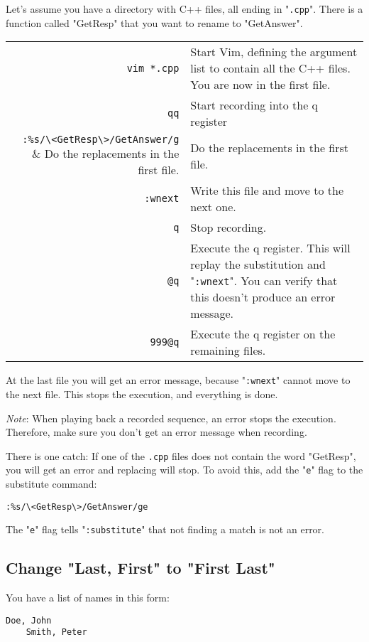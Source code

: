 Let's assume you have a directory with C++ files, all ending in "\verb!.cpp!".
There is a function called "GetResp" that you want to rename to "GetAnswer".

\begin{center} \begin{longtable}{r l}
				\verb!vim *.cpp! & Start Vim, defining the argument list to contain all the C++ files.
				You are now in the first file. \\
				\verb!qq! & Start recording into the q register \\
				\verb!:%s/\<GetResp\>/GetAnswer/g! & Do the replacements in the first file. \\
				\verb!:wnext! & Write this file and move to the next one. \\
				\verb!q! & Stop recording. \\
				\verb!@q! & Execute the q register.
				This will replay the substitution and "\verb!:wnext!".
				You can verify that this doesn't produce an error message. \\
				\verb!999@q! & Execute the q register on the remaining files.  \\
\end{longtable} \end{center}

At the last file you will get an error message, because "\verb!:wnext!" cannot move to the next file.
This stops the execution, and everything is done.

\emph{Note}: When playing back a recorded sequence, an error stops the execution.
Therefore, make sure you don't get an error message when recording.

There is one catch: If one of the \verb!.cpp! files does not contain the word "GetResp", you will get an error and replacing will stop.
To avoid this, add the "\verb!e!" flag to the substitute command:

\begin{Verbatim}[samepage=true]
 :%s/\<GetResp\>/GetAnswer/ge
\end{Verbatim}

The "\verb!e!" flag tells "\verb!:substitute!" that not finding a match is not an error.
\subsection{Change "Last, First" to "First Last"}
You have a list of names in this form:

\begin{Verbatim}[samepage=true]
    Doe, John 
    Smith, Peter 
\end{Verbatim}

